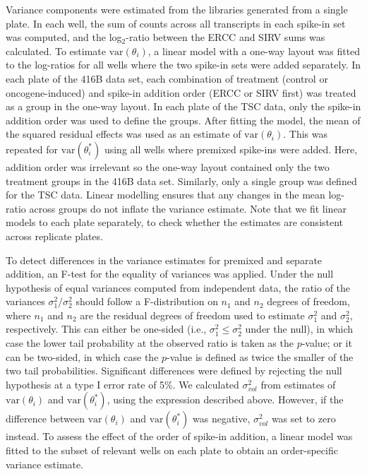 \documentclass{article}
\newcommand\variance{\mbox{var}}
\begin{document}
Variance components were estimated from the libraries generated from a single plate.
In each well, the sum of counts across all transcripts in each spike-in set was computed, and the log$_2$-ratio between the ERCC and SIRV sums was calculated.
To estimate $\variance(\theta_i)$, a linear model with a one-way layout was fitted to the log-ratios for all wells where the two spike-in sets were added separately.
In each plate of the 416B data set, each combination of treatment (control or oncogene-induced) and spike-in addition order (ERCC or SIRV first) was treated as a group in the one-way layout.
In each plate of the TSC data, only the spike-in addition order was used to define the groups.
After fitting the model, the mean of the squared residual effects was used as an estimate of $\variance(\theta_i)$.
This was repeated for $\variance(\theta^*_i)$ using all wells where premixed spike-ins were added.
Here, addition order was irrelevant so the one-way layout contained only the two treatment groups in the 416B data set.
Similarly, only a single group was defined for the TSC data.
Linear modelling ensures that any changes in the mean log-ratio across groups do not inflate the variance estimate.
Note that we fit linear models to each plate separately, to check whether the estimates are consistent across replicate plates.

To detect differences in the variance estimates for premixed and separate addition, an F-test for the equality of variances was applied.
Under the null hypothesis of equal variances computed from independent data, the ratio of the variances $\sigma^2_1/\sigma^2_2$ should follow a F-distribution on $n_1$ and $n_2$ degrees of freedom, where $n_1$ and $n_2$ are the residual degrees of freedom used to estimate $\sigma^2_1$ and $\sigma^2_2$, respectively.
This can either be one-sided (i.e., $\sigma^2_1 \le \sigma^2_2$ under the null), in which case the lower tail probability at the observed ratio is taken as the $p$-value;
or it can be two-sided, in which case the $p$-value is defined as twice the smaller of the two tail probabilities.
Significant differences were defined by rejecting the null hypothesis at a type I error rate of 5\%.
We calculated $\sigma^2_{vol}$ from estimates of $\variance(\theta_i)$ and $\variance(\theta^*_i)$, using the expression described above.
However, if the difference between $\variance(\theta_i)$ and $\variance(\theta^*_i)$ was negative, $\sigma^2_{vol}$ was set to zero instead.
To assess the effect of the order of spike-in addition, a linear model was fitted to the subset of relevant wells on each plate to obtain an order-specific variance estimate.
\end{document}
